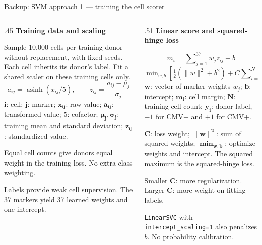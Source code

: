 \documentclass[aspectratio=169,10pt]{beamer}
\newcommand{\eyebrow}[1]{{\color{Teal}\bfseries #1}\par\smallskip}
\newcommand{\compactmath}{%
  \setlength{\abovedisplayskip}{4pt}\setlength{\belowdisplayskip}{4pt}%
  \setlength{\abovedisplayshortskip}{2pt}\setlength{\belowdisplayshortskip}{4pt}}
\begin{document}
\begin{frame}{Backup: SVM approach 1 --- training the cell scorer}
  \small\compactmath
  \begin{columns}[T,onlytextwidth]
    \begin{column}{.45\textwidth}
      \eyebrow{Training data and scaling}
      \small\compactmath Sample 10,000 cells per training donor without replacement, with fixed seeds. Each cell inherits its donor's label. Fit a shared scaler on these training cells only.
      \[a_{ij}=\operatorname{asinh}(x_{ij}/5),\qquad
        z_{ij}=\frac{a_{ij}-\mu_j}{\sigma_j}\]
      {\scriptsize $\boldsymbol{i}$: cell; $\boldsymbol{j}$: marker; $\boldsymbol{x_{ij}}$: raw value; $\boldsymbol{a_{ij}}$: transformed value; 5: cofactor; $\boldsymbol{\mu_j,\sigma_j}$: training mean and standard deviation; $\boldsymbol{z_{ij}}$: standardized value.}\par\medskip
      \small Equal cell counts give donors equal weight in the training loss. No extra class weighting.\par\smallskip
      {\scriptsize Labels provide weak cell supervision. The 37 markers yield 37 learned weights and one intercept.}
    \end{column}
    \begin{column}{.51\textwidth}
      \eyebrow{Linear score and squared-hinge loss}
      \[m_i=\sum\nolimits_{j=1}^{37}w_jz_{ij}+b\]
      \[\min\nolimits_{w,b}\left[\tfrac12(\|w\|^2+b^2)
        +C\sum\nolimits_{i=1}^{N}\max(0,1-y_i m_i)^2\right]\]
      {\scriptsize $\boldsymbol{w}$: vector of marker weights $w_j$; $\boldsymbol{b}$: intercept; $\boldsymbol{m_i}$: cell margin; $\boldsymbol{N}$: training-cell count; $\boldsymbol{y_i}$: donor label, $-1$ for CMV$-$ and $+1$ for CMV$+$.}\par\smallskip
      {\scriptsize $\boldsymbol{C}$: loss weight; $\boldsymbol{\|w\|^2}$: sum of squared weights; $\boldsymbol{\min_{w,b}}$: optimize weights and intercept. The squared maximum is the squared-hinge loss.}\par\smallskip
      \small Smaller $\boldsymbol{C}$: more regularization. Larger $\boldsymbol{C}$: more weight on fitting labels.\par\smallskip
      {\scriptsize \texttt{LinearSVC} with \texttt{intercept\_scaling=1} also penalizes $b$. No probability calibration.}
    \end{column}
  \end{columns}
\end{frame}
\end{document}
